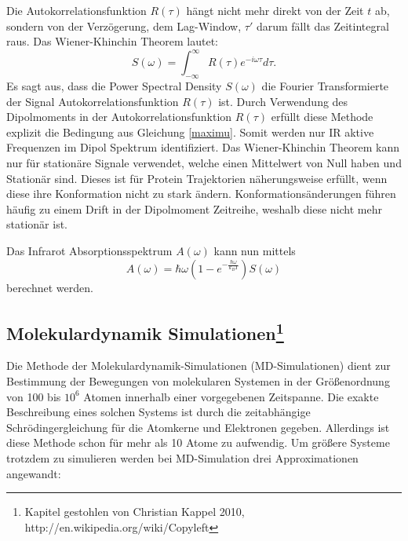 \documentclass[a4paper,12pt]{article}
\begin{document}
Die Autokorrelationsfunktion $R(\tau)$ hängt nicht mehr direkt von der Zeit $t$ ab, sondern von der Verzögerung, dem Lag-Window, $\tau'$ darum fällt das Zeitintegral raus.
Das Wiener-Khinchin Theorem lautet:
  \begin{equation}\label{WKT}
    S(\omega)          =\int_{-\infty}^{\infty} R(\tau) e^{-i\omega\tau} d\tau. 
  \end{equation}
Es sagt aus, dass die Power Spectral Density $S(\omega)$ die Fourier Transformierte der Signal Autokorrelationsfunktion $R(\tau)$ ist.
Durch Verwendung des Dipolmoments in der Autokorrelationsfunktion $R(\tau)$ erfüllt diese Methode explizit die Bedingung aus Gleichung \ref{maximu}. Somit werden nur IR aktive Frequenzen im
Dipol Spektrum identifiziert. Das Wiener-Khinchin Theorem kann nur für stationäre Signale verwendet, welche einen Mittelwert von Null haben und Stationär sind. Dieses ist für Protein Trajektorien 
näherungsweise erfüllt, wenn diese ihre Konformation nicht zu stark ändern. Konformationsänderungen führen häufig zu einem Drift in der Dipolmoment Zeitreihe, weshalb diese nicht mehr stationär ist.

Das Infrarot Absorptionsspektrum $A(\omega)$ kann nun mittels 
\begin{equation}
 A(\omega)= \hbar\omega \left( 1-e^{-\frac{\hbar \omega}{k_B T}} \right) S(\omega)
\end{equation}
berechnet werden. 



\subsection*{Molekulardynamik Simulationen\footnote{Kapitel gestohlen von Christian Kappel 2010, http://en.wikipedia.org/wiki/Copyleft}}

Die Methode der Molekulardynamik-Simulationen (MD-Simulationen) dient zur
Bestimmung der Bewegungen von molekularen Systemen in der Größenordnung von
100 bis $10^6$ Atomen innerhalb einer vorgegebenen Zeitspanne.
Die exakte Beschreibung eines solchen Systems ist durch die zeitabhängige
Schrödingergleichung für die Atomkerne und Elektronen gegeben. Allerdings ist
diese Methode schon für mehr als 10 Atome zu aufwendig. Um größere Systeme
trotzdem zu simulieren werden bei MD-Simulation drei Approximationen angewandt:
\end{document}

